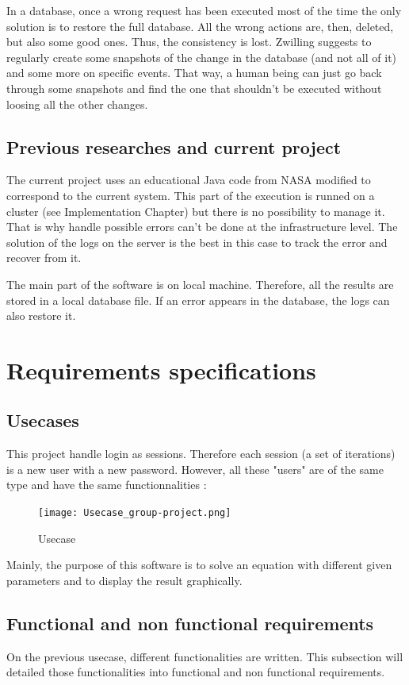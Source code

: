 \documentclass[10pt,a4paper]{report}
\begin{document}
In a database, once a wrong request has been executed most of the time the only solution is to restore the full database. All the wrong actions are, then, deleted, but also some good ones. Thus, the consistency is lost. Zwilling \cite{TecReview8} suggests to regularly create some snapshots of the change in the database (and not all of it) and some more on specific events. That way, a human being can just go back through some snapshots and find the one that shouldn't be executed without loosing all the other changes.	

	\section{Previous researches and current project}
The current project uses an educational Java code from NASA modified to correspond to the current system. This part of the execution is runned on a cluster (see Implementation Chapter) but there is no possibility to manage it. That is why handle possible errors can't be done at the infrastructure level. The solution of the logs on the server is the best in this case to track the error and recover from it. 

The main part of the software is on local machine. Therefore, all the results are stored in a local database file. If an error appears in the database, the logs can also restore it.



\chapter{Requirements specifications}
	\section{Usecases}
This project handle login as sessions. Therefore each session (a set of iterations) is a new user with a new password.  However, all these "users" are of the same type and have the same functionnalities : \\
\begin{figure}[h!]
\texttt{[image: Usecase\_group-project.png]}\\
\caption{Usecase}
\end{figure}


Mainly, the purpose of this software is to solve an equation with different given parameters and to display the result graphically.
	\section{Functional and non functional requirements}
On the previous usecase, different functionalities are written. This subsection will detailed those functionalities into functional and non functional requirements.
\end{document}
